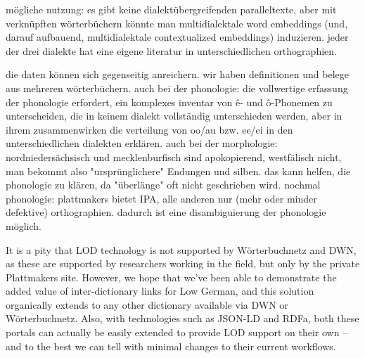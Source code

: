 \documentclass{article}
\begin{document}
mögliche nutzung: es gibt keine dialektübergreifenden paralleltexte, aber mit verknüpften wörterbüchern könnte man multidialektale word embeddings (und, darauf aufbauend, multidialektale contextualized embeddings) induzieren. jeder der drei dialekte hat eine eigene literatur in unterschiedlichen orthographien.

die daten können sich gegenseitig anreichern. wir haben definitionen und belege aus mehreren wörterbüchern. auch bei der phonologie: die vollwertige erfassung der phonologie erfordert, ein komplexes inventar von ê- und ô-Phonemen zu unterscheiden, die in keinem dialekt vollständig unterschieden werden, aber in ihrem zusammenwirken die verteilung von oo/au bzw. ee/ei in den unterschiedlichen dialekten erklären. auch bei der morphologie: nordniedersächsisch und mecklenburfisch sind apokopierend, westfälisch nicht, man bekommt also "ursprünglichere" Endungen und silben. das kann helfen, die phonologie zu klären, da "überlänge" oft nicht geschrieben wird. nochmal phonologie: plattmakers bietet IPA, alle anderen nur (mehr oder minder defektive) orthographien. dadurch ist eine disambiguierung der phonologie möglich.


It is a pity that LOD technology is not supported by Wörterbuchnetz and DWN, as these are supported by researchers working in the field, but only by the private Plattmakers site. However, we hope that we've been able to demonstrate the added value of inter-dictionary links for Low German, and this solution organically extends to any other dictionary available via DWN or Wörterbuchnetz. Also, with technologies such as JSON-LD and RDFa, both these portals can actually be easily extended to provide LOD support on their own -- and to the best we can tell with minimal changes to their current workflows.
\end{document}

